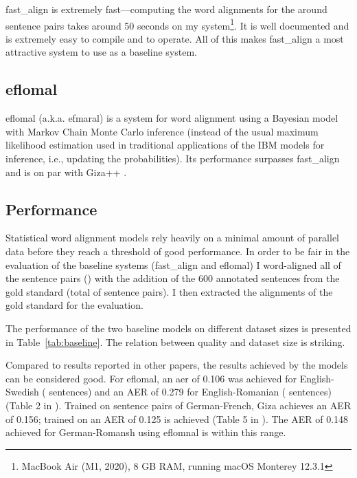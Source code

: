 fast\_align is extremely fast---computing the word alignments for the around  sentence pairs takes around 50 seconds on my system\footnote{MacBook Air (M1, 2020), 8 GB RAM, running macOS Monterey 12.3.1}. 
It is well documented and is extremely easy to compile and to operate. 
All of this makes fast\_align a most attractive system to use as a baseline system.

\subsection{eflomal}
eflomal (a.k.a. efmaral\footnotemark) is a system for word alignment using a Bayesian model with Markov Chain Monte Carlo inference (instead of the usual maximum likelihood estimation used in traditional applications of the IBM models for inference, i.e., updating the probabilities). 
Its performance surpasses fast\_align and is on par with Giza++ \autocite{Ostling2016efmaral}.



\subsection{Performance}
Statistical word alignment models rely heavily  on a minimal amount of parallel data before they reach a threshold of good performance. In order to be fair in the evaluation of the baseline systems (fast\_align and eflomal) I word-aligned all of the sentence pairs () with  the addition of the 600 annotated sentences from the gold standard (total of  sentence pairs). I then extracted the alignments of the gold standard for the evaluation.
 

The performance of the two baseline models on different dataset sizes is presented in Table~\ref{tab:baseline}. The relation between quality and dataset size is striking. 

Compared to  results reported in other papers, the results achieved by the models can be considered good. 
For eflomal,  an \acrshort{aer} of 0.106  was achieved for English-Swedish ( sentences) and an AER of 0.279 for English-Romanian ( sentences) (Table 2 in \cite{Ostling2016efmaral}). 
Trained on  sentence pairs of German-French, Giza achieves an AER of 0.156; trained on  an AER of 0.125 is achieved (Table 5 in \cite{och-ney-2000-improved}). 
The AER of 0.148 achieved for German-Romansh using eflomnal is within this range.



